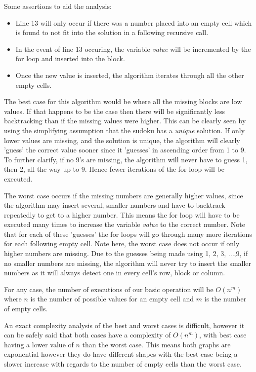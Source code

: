 \documentclass{article}
\begin{document}
Some assertions to aid the analysis:
\begin{itemize}
	\item Line 13 will only occur if there was a number placed into an empty cell which is found to not fit into the solution in a following recursive call.
	\item In the event of line 13 occuring, the variable \emph{value} will be incremented by the for loop and inserted into the block.
	\item Once the new value is inserted, the algorithm iterates through all the other empty cells. 
\end{itemize}

The best case for this algorithm would be where all the missing blocks are low values. If that happens to be the case then there will be significantly less backtracking than if the missing values were higher. This can be clearly seen by using the simplifying assumption that the sudoku has a \emph{unique} solution. If only lower values are missing, and the solution is unique, the algorithm will clearly 'guess' the correct value sooner since it 'guesses' in ascending order from 1 to 9. To further clarify, if no 9's are missing, the algorithm will never have to guess 1, then 2, all the way up to 9. Hence fewer iterations of the for loop will be executed.

The worst case occurs if the missing numbers are generally higher values, since the algorithm may insert several, smaller numbers and have to backtrack repeatedly to get to a higher number. This means the for loop will have to be executed many times to increase the variable \emph{value} to the correct number. Note that for each of these 'guesses' the for loops will go through many more iterations for each following empty cell. Note here, the worst case does not occur if only higher numbers are missing. Due to the guesses being made using 1, 2, 3, ...,9, if no smaller numbers are missing, the algorithm will never try to insert the smaller numbers as it will always detect one in every cell's row, block or column.

For any case, the number of executions of our basic operation will be $O(n^m)$ where $n$ is the number of possible values for an empty cell and $m$ is the number of empty cells.

An exact complexity analysis of the best and worst cases is difficult, however it can be safely said that both cases have a complexity of $O(n^m)$, with best case having a lower value of $n$ than the worst case. This means both graphs are exponential however they do have different shapes with the best case being a slower increase with regards to the number of empty cells than the worst case.
\end{document}
